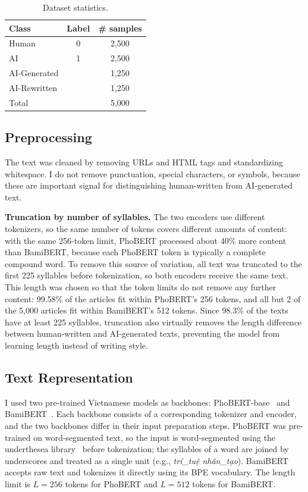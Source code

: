 \documentclass[conference,a4paper]{IEEEtran}
\begin{document}
\begin{table}[t]
  \centering
  \caption{Dataset statistics.}
  \label{tab:dataset}
  \setlength{\tabcolsep}{8pt}
  \begin{tabular}{lcc}
    \toprule
    Class & Label & \# samples \\
    \midrule
    Human & 0 & 2,500 \\
    AI    & 1 & 2,500 \\
    \quad AI-Generated &   & 1,250 \\
    \quad AI-Rewritten &   & 1,250 \\
    \midrule
    Total &   & 5,000 \\
    \bottomrule
  \end{tabular}
\end{table}

\subsection{Preprocessing}
The text was cleaned by removing URLs and HTML tags and standardizing whitespace. I do not remove punctuation, special characters, or symbols, because these are important signal for distinguishing human-written from AI-generated text.

\textbf{Truncation by number of syllables.} The two encoders use different tokenizers, so the same number of tokens covers different amounts of content: with the same 256-token limit, PhoBERT processed about 40\% more content than BamiBERT, because each PhoBERT token is typically a complete compound word. To remove this source of variation, all text was truncated to the first 225 syllables before tokenization, so both encoders receive the same text. This length was chosen so that the token limits do not remove any further content: 99.58\% of the articles fit within PhoBERT's 256 tokens, and all but 2 of the 5,000 articles fit within BamiBERT's 512 tokens. Since 98.3\% of the texts have at least 225 syllables, truncation also virtually removes the length difference between human-written and AI-generated texts, preventing the model from learning length instead of writing style.

\subsection{Text Representation}
I used two pre-trained Vietnamese models as backbones: PhoBERT-base~\cite{phobert} and BamiBERT~\cite{bamibert}. Each backbone consists of a corresponding tokenizer and encoder, and the two backbones differ in their input preparation steps. PhoBERT was pre-trained on word-segmented text, so the input is word-segmented using the underthesea library~\cite{underthesea} before tokenization; the syllables of a word are joined by underscores and treated as a single unit (e.g., \emph{trí\_tuệ nhân\_tạo}). BamiBERT accepts raw text and tokenizes it directly using its BPE vocabulary. The length limit is $L = 256$ tokens for PhoBERT and $L = 512$ tokens for BamiBERT.
\end{document}
